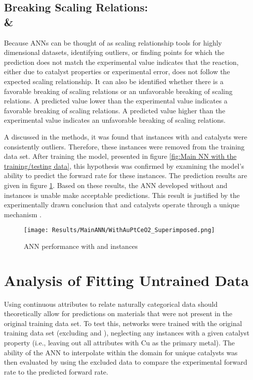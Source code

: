 	\subsection{Breaking Scaling Relations:\\ \& }
	Because ANNs can be thought of as scaling relationship tools for highly dimensional datasets, identifying outliers, or finding points for which the prediction does not match the experimental value indicates that the reaction, either due to catalyst properties or experimental error, does not follow the expected scaling relationship. It can also be identified whether there is a favorable breaking of scaling relations or an unfavorable breaking of scaling relations. A predicted value lower than the experimental value indicates a favorable breaking of scaling relations. A predicted value higher than the experimental value indicates an unfavorable breaking of scaling relations. 

	A discussed in the methods, it was found that instances with  and  catalysts were consistently outliers. Therefore, these instances were removed from the training data set. After training the model, presented in figure \ref{fig:Main NN with the training/testing data}, this hypothesis was confirmed by examining the model's ability to predict the forward rate for these instances. The prediction results are given in figure \ref{fig:Main NN with Au,Pt/CeO2}. Based on these results, the ANN developed without  and  instances is unable make acceptable predictions. This result is justified by the experimentally drawn conclusion that  and  catalysts operate through a unique mechanism \cite{Fu_2003,Bunluesin_1998,Weiling_2006}.

		\begin{figure}[!htbp]
		    \centering
		    \texttt{[image: Results/MainANN/WithAuPtCeO2\_Superimposed.png]}
	        \caption{ANN performance with  and  instances}
	        \label{fig:Main NN with Au,Pt/CeO2}
		\end{figure}
	\FloatBarrier

\section{Analysis of Fitting Untrained Data}
Using continuous attributes to relate naturally categorical data should theoretically allow for predictions on materials that were not present in the original training data set. To test this, networks were trained with the original training data set (excluding  and ), neglecting any instances with a given catalyst property (i.e., leaving out all attributes with Cu as the primary metal). The ability of the ANN to interpolate within the domain for unique catalysts was then evaluated by using the excluded data to compare the experimental forward rate to the predicted forward rate.

